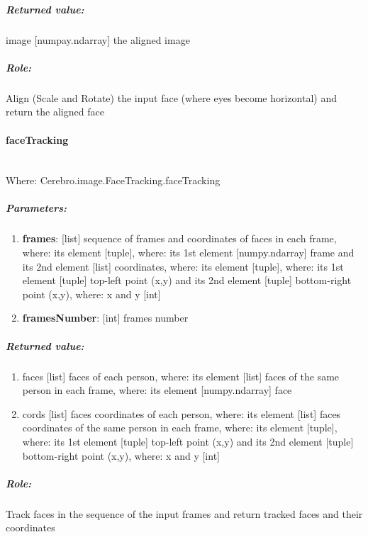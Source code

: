 \subparagraph{Returned value:}
\begin{changemargin}{1cm}{0cm}
	image [numpay.ndarray] the aligned image
\end{changemargin}

\subparagraph{Role:}
\begin{changemargin}{1cm}{0cm}
	Align (Scale and Rotate) the input face (where eyes become horizontal) and return the aligned face
\end{changemargin}


\paragraph{faceTracking} \mbox{} \\
Where: Cerebro.image.FaceTracking.faceTracking
\subparagraph{Parameters:}
\begin{changemargin}{0.5cm}{0cm}
	\begin{enumerate}
		\item \textbf{frames}: [list] sequence of frames and coordinates of faces in each frame, where: its element [tuple], where: its 1st element [numpy.ndarray] frame and its 2nd element [list] coordinates, where: its element [tuple], where: its 1st element [tuple] top-left point (x,y) and its 2nd element [tuple] bottom-right point (x,y), where: x and y [int]
		\item \textbf{framesNumber}: [int] frames number
	\end{enumerate}
\end{changemargin}

\subparagraph{Returned value:}
\begin{changemargin}{1cm}{0cm}
	\begin{enumerate} 
		\item faces [list] faces of each person, where: its element [list] faces of the same person in each frame, where: its element [numpy.ndarray] face
		\item cords [list] faces coordinates of each person, where: its element [list] faces coordinates of the same person in each frame, where: its element [tuple], where: its 1st element [tuple] top-left point (x,y) and its 2nd element [tuple] bottom-right point (x,y), where: x and y [int]
	\end{enumerate}
\end{changemargin}

\subparagraph{Role:}
\begin{changemargin}{1cm}{0cm}
	Track faces in the sequence of the input frames and return tracked faces and their coordinates
\end{changemargin}